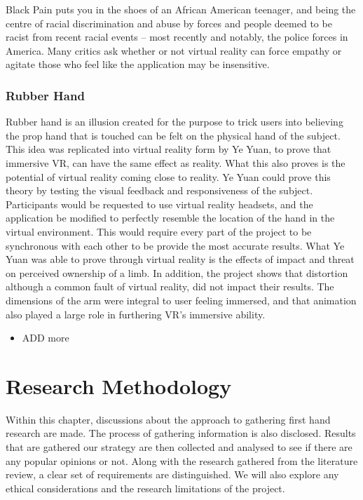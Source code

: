 \documentclass[12pt]{report}
\begin{document}
Black Pain puts you in the shoes of an African American teenager, and being the centre of racial discrimination and abuse by forces and people deemed to be racist from recent racial events – most recently and notably, the police forces in America. Many critics ask whether or not virtual reality can force empathy or agitate those who feel like the application may be insensitive. 

\subsection{Rubber Hand}
Rubber hand is an illusion created for the purpose to trick users into believing the prop hand that is touched can be felt on the physical hand of the subject. This idea was replicated into virtual reality form by Ye Yuan, to prove that immersive VR, can have the same effect as reality. What this also proves is the potential of virtual reality coming close to reality. Ye Yuan could prove this theory by testing the visual feedback and responsiveness of the subject. Participants would be requested to use virtual reality headsets, and the application be modified to perfectly resemble the location of the hand in the virtual environment. This would require every part of the project to be synchronous with each other to be provide the most accurate results.
What Ye Yuan was able to prove through virtual reality is the effects of impact and threat on perceived ownership of a limb. In addition, the project shows that distortion although a common fault of virtual reality, did not impact their results. The dimensions of the arm were integral to user feeling immersed, and that animation also played a large role in furthering VR’s immersive ability.
 \begin{itemize}
	
	\item ADD more
\end{itemize}
\chapter{Research Methodology}
Within this chapter, discussions about the approach to gathering first hand research are made. The process of gathering information is also disclosed. Results that are gathered our strategy are then collected and analysed to see if there are any popular opinions or not. Along with the research gathered from the literature review, a clear set of requirements are distinguished. We will also explore any ethical considerations and the research limitations of the project.
\end{document}
